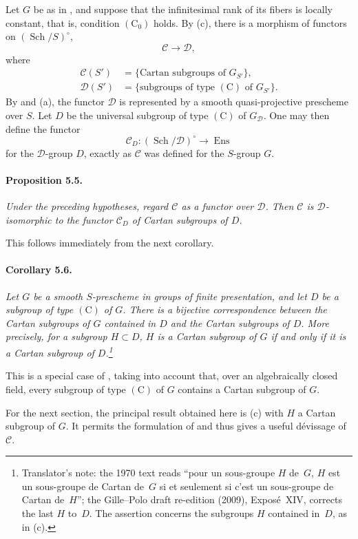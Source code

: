 Let \(G\) be as in , and suppose that the infinitesimal rank of
its fibers is locally constant, that is, condition
\((\mathrm C_0)\) holds. By \textup{(c)}, there is a morphism of
functors on \((\operatorname{Sch}/S)^\circ\),
\[
  \mathcal C\longrightarrow\mathcal D,
\]
where
\[
  \begin{aligned}
  \mathcal C(S')&=
    \{\text{Cartan subgroups of }G_{S'}\},\\
  \mathcal D(S')&=
    \{\text{subgroups of type \((\mathrm C)\) of }G_{S'}\}.
  \end{aligned}
\]
By  and \textup{(a)}, the functor \(\mathcal D\) is
represented by a smooth quasi-projective prescheme over \(S\).
Let \(D\) be the universal subgroup of type \((\mathrm C)\) of
\(G_{\mathcal D}\). One may then define the functor
\[
  \mathcal C_D\colon
  (\operatorname{Sch}/\mathcal D)^\circ
  \longrightarrow\operatorname{Ens}
\]
for the \(\mathcal D\)-group \(D\), exactly as \(\mathcal C\) was
defined for the \(S\)-group \(G\).

\paragraph{\textbf{Proposition 5.5.}}
{\itshape Under the preceding hypotheses, regard \(\mathcal C\) as
a functor over \(\mathcal D\). Then \(\mathcal C\) is
\(\mathcal D\)-isomorphic to the functor \(\mathcal C_D\) of
Cartan subgroups of \(D\).}

This follows immediately from the next corollary.

\paragraph{\textbf{Corollary 5.6.}}
{\itshape Let \(G\) be a smooth \(S\)-prescheme in groups of finite
presentation, and let \(D\) be a subgroup of type \((\mathrm C)\)
of \(G\). There is a bijective correspondence between the Cartan
subgroups of \(G\) contained in \(D\) and the Cartan subgroups of
\(D\). More precisely, for a subgroup \(H\subset D\), \(H\) is a
Cartan subgroup of \(G\) if and only if it is a Cartan subgroup of
\(D\).\footnote{Translator's note: the 1970 text reads ``pour un sous-groupe \(H\) de~\(G\), \(H\) est un sous-groupe de Cartan de~\(G\) si et seulement si c'est un sous-groupe de Cartan de~\(H\)''; the Gille--Polo draft re-edition (2009), Exposé~XIV, corrects the last \(H\) to~\(D\). The assertion concerns the subgroups \(H\) contained in~\(D\), as in \textup{(c)}.}}

This is a special case of \textup{}, taking into account
that, over an algebraically closed field, every subgroup of type
\((\mathrm C)\) of \(G\) contains a Cartan subgroup of \(G\).

For the next section, the principal result obtained here is
\textup{(c)} with \(H\) a Cartan subgroup of \(G\). It permits
the formulation of  and thus gives a useful dévissage of
\(\mathcal C\).
